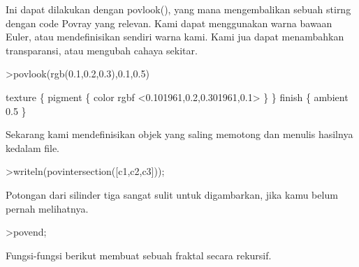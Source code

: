 \documentclass[a4paper,10pt]{article}
\begin{document}
\begin{eulernotebook}
\begin{eulercomment}
Ini dapat dilakukan dengan povlook(), yang mana mengembalikan sebuah
stirng dengan code Povray yang relevan. Kami dapat menggunakan warna
bawaan Euler, atau mendefinisikan sendiri warna kami. Kami jua dapat
menambahkan transparansi, atau mengubah cahaya sekitar.
\end{eulercomment}
\begin{eulerprompt}
>povlook(rgb(0.1,0.2,0.3),0.1,0.5)
\end{eulerprompt}
\begin{euleroutput}
   texture \{ pigment \{ color rgbf <0.101961,0.2,0.301961,0.1> \}  \} 
   finish \{ ambient 0.5 \} 
  
\end{euleroutput}
\begin{eulercomment}
Sekarang kami mendefinisikan objek yang saling memotong dan menulis
hasilnya kedalam file.
\end{eulercomment}
\begin{eulerprompt}
>writeln(povintersection([c1,c2,c3]));
\end{eulerprompt}
\begin{eulercomment}
Potongan dari silinder tiga sangat sulit untuk digambarkan, jika kamu
belum pernah melihatnya.
\end{eulercomment}
\begin{eulerprompt}
>povend;
\end{eulerprompt}
\begin{eulercomment}
Fungsi-fungsi berikut membuat sebuah fraktal secara rekursif.


\end{eulercomment}
\end{eulernotebook}
\end{document}
